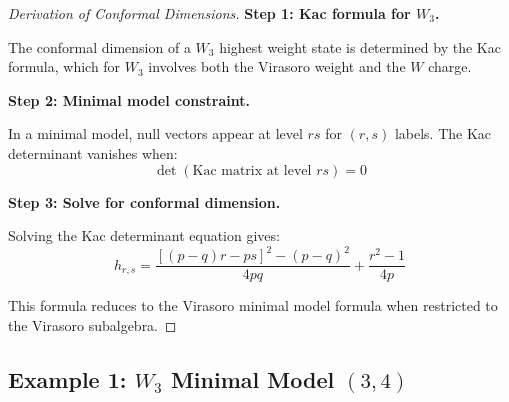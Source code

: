 \begin{proof}[Derivation of Conformal Dimensions]

\textbf{Step 1: Kac formula for $W_3$.}

The conformal dimension of a $W_3$ highest weight state is determined by the 
Kac formula, which for $W_3$ involves both the Virasoro weight and the $W$ charge.

\textbf{Step 2: Minimal model constraint.}

In a minimal model, null vectors appear at level $rs$ for $(r,s)$ labels. The 
Kac determinant vanishes when:
$$\det(\text{Kac matrix at level } rs) = 0$$

\textbf{Step 3: Solve for conformal dimension.}

Solving the Kac determinant equation gives:
$$h_{r,s} = \frac{[(p-q)r - ps]^2 - (p-q)^2}{4pq} + \frac{r^2 - 1}{4p}$$

This formula reduces to the Virasoro minimal model formula when restricted to 
the Virasoro subalgebra.
\end{proof}

\subsection{Example 1: $W_3$ Minimal Model $(3,4)$}
\label{subsec:w3-example-3-4}


